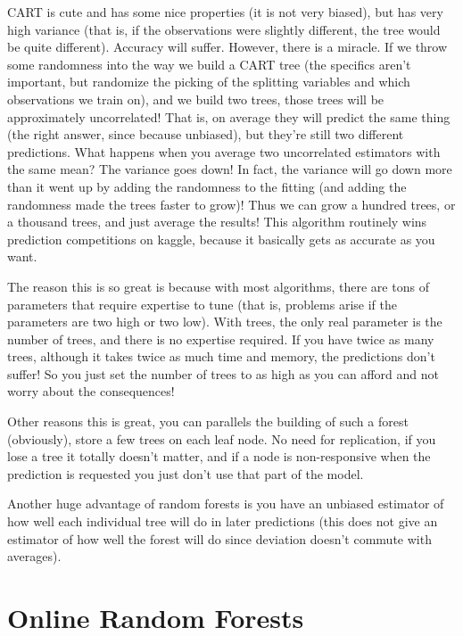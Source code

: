 \documentclass[a4paper,12pt]{article}
\begin{document}
CART is cute and has some nice properties (it is not very biased), but has very high variance (that is, if the observations were slightly different, the tree would be quite different).
Accuracy will suffer.
However, there is a miracle.
If we throw some randomness into the way we build a CART tree (the specifics aren't important, but randomize the picking of the splitting variables and which observations we train on), and we build two trees, those trees will be approximately uncorrelated!
That is, on average they will predict the same thing (the right answer, since because unbiased), but they're still two different predictions.
What happens when you average two uncorrelated estimators with the same mean?  The variance goes down!
In fact, the variance will go down more than it went up by adding the randomness to the fitting (and adding the randomness made the trees faster to grow)!
Thus we can grow a hundred trees, or a thousand trees, and just average the results!
This algorithm routinely wins prediction competitions on kaggle, because it basically gets as accurate as you want.

The reason this is so great is because with most algorithms, there are tons of parameters that require expertise to tune (that is, problems arise if the parameters are two high or two low).  
With trees, the only real parameter is the number of trees, and there is no expertise required.
If you have twice as many trees, although it takes twice as much time and memory, the predictions don't suffer!
So you just set the number of trees to as high as you can afford and not worry about the consequences!

Other reasons this is great, you can parallels the building of such a forest (obviously), store a few trees on each leaf node.
No need for replication, if you lose a tree it totally doesn't matter, and if a node is non-responsive when the prediction is requested you just don't use that part of the model.

Another huge advantage of random forests is you have an unbiased estimator of how well each individual tree will do in later predictions (this does not give an estimator of how well the forest will do since deviation doesn't commute with averages).  

\section*{Online Random Forests}
\end{document}
